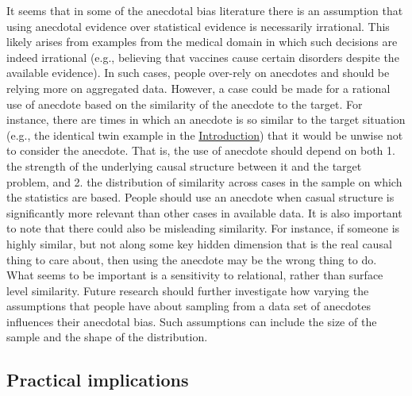 \documentclass[a4paper, nobind, dvipsnames]{templates/ociamthesis}
\theoremstyle{definition}
\theoremstyle{definition}
\theoremstyle{definition}
\theoremstyle{definition}
\theoremstyle{remark}
\begin{document}
It seems that in some of the anecdotal bias literature there is an assumption
that using anecdotal evidence over statistical evidence is necessarily
irrational. This likely arises from examples from the medical domain in which
such decisions are indeed irrational (e.g., believing that vaccines cause
certain disorders despite the available evidence). In such cases, people
over-rely on anecdotes and should be relying more on aggregated data. However, a
case could be made for a rational use of anecdote based on the similarity of the
anecdote to the target. For instance, there are times in which an anecdote is so
similar to the target situation (e.g., the identical twin example in the
\protect\hyperlink{effect-of-similarity-anecdotes}{Introduction}) that it would be unwise not to
consider the anecdote. That is, the use of anecdote should depend on both 1. the
strength of the underlying causal structure between it and the target problem,
and 2. the distribution of similarity across cases in the sample on which the
statistics are based. People should use an anecdote when casual structure is
significantly more relevant than other cases in available data. It is also
important to note that there could also be misleading similarity. For instance,
if someone is highly similar, but not along some key hidden dimension that is
the real causal thing to care about, then using the anecdote may be the wrong
thing to do. What seems to be important is a sensitivity to relational, rather
than surface level similarity. Future research should further investigate how
varying the assumptions that people have about sampling from a data set of
anecdotes influences their anecdotal bias. Such assumptions can include the size
of the sample and the shape of the distribution.

\hypertarget{practical-implications-1}{%
\subsection{Practical implications}\label{practical-implications-1}}
\end{document}
